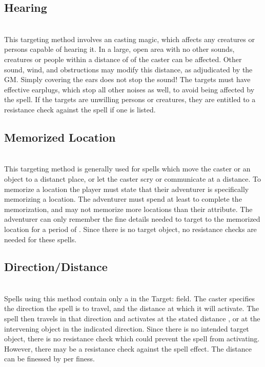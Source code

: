 \begin{multicols}{2}
\subsection{Hearing}
\\
This targeting method involves an  casting magic, which affects any creatures or persons capable of hearing it. In a large, open area with no other sounds,  creatures or people within a distance of  of the caster can be affected. Other sound, wind, and obstructions may modify this distance, as adjudicated by the GM. Simply covering the ears does not stop the sound! The targets must have effective earplugs, which stop all other noises as well, to avoid being affected by the spell. If the targets are unwilling persons or creatures, they are entitled to a resistance check against the spell if one is listed.
\subsection{Memorized Location}
\\
This targeting method is generally used for spells which move the caster or an object to a distanct place, or let the caster scry or communicate at a distance. To memorize a location the player must state that their adventurer is specifically memorizing a location. The adventurer must spend at least  to complete the memorization, and may not memorize more locations than their \INT attribute. The adventurer can only remember the fine details needed to target to the memorized location for a period of . Since there is no target object, no resistance checks are needed for these spells.
\subsection{Direction/Distance}
\\
Spells using this method contain only a  in the Target: field. The caster specifies the direction the spell is to travel, and the distance at which it will activate. The spell then travels in that direction and activates at the stated distance , or at the  intervening object in the indicated direction. Since there is no intended target object, there is no resistance check which could prevent the spell from activating. However, there may be a resistance check against the spell effect. The distance can be finessed by  per finess.

\end{multicols}
